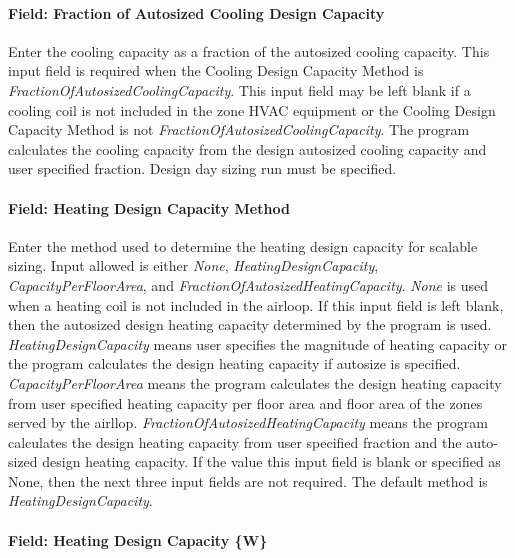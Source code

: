 \paragraph{Field: Fraction of Autosized Cooling Design Capacity}\label{field-fraction-of-autosized-cooling-design-capacity-1}

Enter the cooling capacity as a fraction of the autosized cooling capacity. This input field is required when the Cooling Design Capacity Method is \emph{FractionOfAutosizedCoolingCapacity}. This input field may be left blank if a cooling coil is not included in the zone HVAC equipment or the Cooling Design Capacity Method is not \emph{FractionOfAutosizedCoolingCapacity}. The program calculates the cooling capacity from the design autosized cooling capacity and user specified fraction. Design day sizing run must be specified.

\paragraph{Field: Heating Design Capacity Method}\label{field-heating-design-capacity-method-1}

Enter the method used to determine the heating design capacity for scalable sizing. Input allowed is either \emph{None}, \emph{HeatingDesignCapacity}, \emph{CapacityPerFloorArea}, and \emph{FractionOfAutosizedHeatingCapacity}. \emph{None} is used when a heating coil is not included in the airloop. If this input field is left blank, then the autosized design heating capacity determined by the program is used. \emph{HeatingDesignCapacity} means user specifies the magnitude of heating capacity or the program calculates the design heating capacity if autosize is specified. \emph{CapacityPerFloorArea} means the program calculates the design heating capacity from user specified heating capacity per floor area and floor area of the zones served by the airllop. \emph{FractionOfAutosizedHeatingCapacity} means the program calculates the design heating capacity from user specified fraction and the auto-sized design heating capacity. If the value this input field is blank or specified as None, then the next three input fields are not required. The default method is \emph{HeatingDesignCapacity}.

\paragraph{Field: Heating Design Capacity \{W\}}\label{field-heating-design-capacity-w-1}

